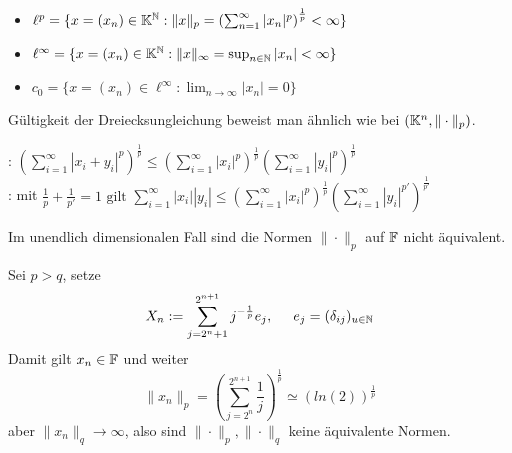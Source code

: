 \begin{beispiel}   
	\begin{itemize}
		\item $\ell^{p} = \{ x = (x_{n}) \in \mathbb{K}^{\mathbb{N}}: \|x\|_{p} = \left( \sum_{n = 1}^{\infty} | x_{n} |^{p}\right)^{\frac{1}{p}} < \infty \}$
		\item $\ell^{\infty} = \{ x = (x_{n}) \in \mathbb{K}^{\mathbb{N}  }: \|x\|_{\infty} = \sup_{n \in \mathbb{N}} |x_{n}| < \infty \}$
		\item $c_{0} = \{ x = (x_{n}) \in \ell^{\infty}: \lim_{n \rightarrow \infty} |x_{n}| = 0 \}$
	\end{itemize}
Gültigkeit der Dreiecksungleichung beweist man ähnlich wie bei $(\mathbb{K}^{n}, \| \cdot \|_{p})$.
\end{beispiel}

\begin{lemma}
: $\left( \sum_{i=1}^{\infty} |x_{i} + y_{i}|^p\right)^{\frac{1}{p}} \leq\left( \sum_{i=1}^{\infty} |x_{i}|^p\right)^{\frac{1}{p}} \left( \sum_{i=1}^{\infty} |y_{i}|^p\right)^{\frac{1}{p}} $	\\
: mit $\frac{1}{p} + \frac{1}{p'} = 1 \text{ gilt } \sum_{i=1}^{\infty} |x_{i}| |y_{i}| \leq \left( \sum_{i=1}^{\infty} |x_{i}|^{p} \right)^{\frac{1}{p}} \left( \sum_{i=1}^{\infty} |y_{i}|^{p'} \right)^{\frac{1}{p'}} $	\\	
\end{lemma}

\begin{bemerkung}
	Im unendlich dimensionalen Fall sind die Normen $\| \cdot \|_{p}$ auf $\mathbb{F}$ nicht äquivalent.
	\begin{beweis}
		Sei $p > q$, setze 
		\[ X_{n} := \sum_{j = 2^{n} + 1}^{2^{n + 1}} j^{-\frac{1}{p}}e_{j}, \hspace{0.5cm} e_{j} = ( \delta_{ij} )_{u \in \mathbb{N}} \]
		Damit gilt $x_{n} \in \mathbb{F}$ und weiter
		\[ \| x_{n} \|_{p} = \left( \sum_{j = 2^{n}}^{2^{n + 1}} \frac{1}{j} \right)^{\frac{1}{p}} \simeq \left( ln(2) \right)^{\frac{1}{p}} \]
		aber $\| x_{n} \|_{q} \rightarrow \infty$, also sind $\| \cdot \|_{p}, \| \cdot \|_{q}$ keine äquivalente Normen.
	\end{beweis}	
\end{bemerkung}



